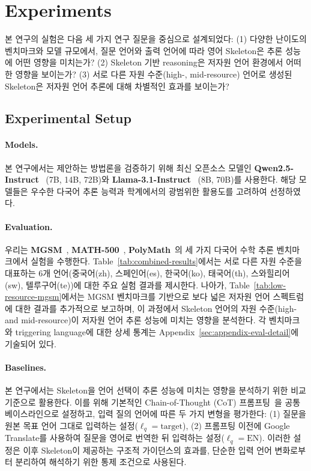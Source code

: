 \section{Experiments}

본 연구의 실험은 다음 세 가지 연구 질문을 중심으로 설계되었다: (1) 다양한 난이도의 벤치마크와 모델 규모에서, 질문 언어와 출력 언어에 따라 영어 Skeleton은 추론 성능에 어떤 영향을 미치는가? (2) Skeleton 기반 reasoning은 저자원 언어 환경에서 어떠한 영향을 보이는가? (3) 서로 다른 자원 수준(high-, mid-resource) 언어로 생성된 Skeleton은 저자원 언어 추론에 대해 차별적인 효과를 보이는가?

\subsection{Experimental Setup}
\paragraph{Models.}
본 연구에서는 제안하는 방법론을 검증하기 위해 최신 오픈소스 모델인 \textbf{Qwen2.5-Instruct}~\citep{qwen2.5} (7B, 14B, 72B)와 \textbf{Llama-3.1-Instruct}~\citep{llama3} (8B, 70B)를 사용한다. 해당 모델들은 우수한 다국어 추론 능력과 학계에서의 광범위한 활용도를 고려하여 선정하였다.

\paragraph{Evaluation.}
우리는 \textbf{MGSM}~\citep{mgsm}, \textbf{MATH-500}~\citep{math500}, \textbf{PolyMath}~\citep{polymath}의 세 가지 다국어 수학 추론 벤치마크에서 실험을 수행한다.
Table~\ref{tab:combined-results}에서는 서로 다른 자원 수준을 대표하는 6개 언어(중국어(zh), 스페인어(es), 한국어(ko), 태국어(th), 스와힐리어(sw), 텔루구어(te))에 대한 주요 실험 결과를 제시한다. 나아가, Table~\ref{tab:low-resource-mgsm}에서는 MGSM 벤치마크를 기반으로 보다 넓은 저자원 언어 스펙트럼에 대한 결과를 추가적으로 보고하며, 이 과정에서 Skeleton 언어의 자원 수준(high- and mid-resource)이 저자원 언어 추론 성능에 미치는 영향을 분석한다.
각 벤치마크와 triggering language에 대한 상세 통계는 Appendix~\ref{sec:appendix-eval-detail}에 기술되어 있다.

\paragraph{Baselines.}
본 연구에서는 Skeleton을 언어 선택이 추론 성능에 미치는 영향을 분석하기 위한 비교 기준으로 활용한다. 이를 위해 기본적인 Chain-of-Thought (CoT) 프롬프팅~\citep{cot}을 공통 베이스라인으로 설정하고, 입력 질의 언어에 따른 두 가지 변형을 평가한다: (1) 질문을 원본 목표 언어 그대로 입력하는 설정($\ell_q=\text{target}$), (2) 프롬프팅 이전에 Google Translate를 사용하여 질문을 영어로 번역한 뒤 입력하는 설정($\ell_q=\text{EN}$). 이러한 설정은 이후 Skeleton이 제공하는 구조적 가이던스의 효과를, 단순한 입력 언어 변화로부터 분리하여 해석하기 위한 통제 조건으로 사용된다.

